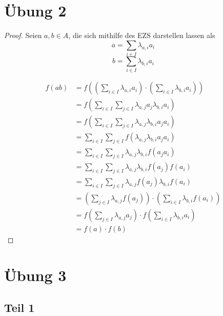 \documentclass[10pt,a4paper]{article}
\begin{document}
\section*{Übung 2}

\begin{proof}
Seien $a, b \in A$, die sich mithilfe des EZS darstellen lassen als
\begin{equation}
a = \sum_{i \in I} \lambda_{a, i} a_{i}
\end{equation}
\begin{equation}
b = \sum_{i \in I} \lambda_{b, i} a_{i}
\end{equation}

\begin{align*}
f(ab) & = f \left( \left( \sum_{i \in I} \lambda_{a, i} a_{i} \right) \cdot \left( \sum_{i \in I} \lambda_{b, i} a_{i} \right) \right)\\
& = f \left( \sum_{i \in I} \sum_{j \in I} \lambda_{a, j} a_{j} \lambda_{b, i} a_{i} \right)\\
& = f \left( \sum_{i \in I} \sum_{j \in I} \lambda_{a, j} \lambda_{b, i} a_{j} a_{i} \right)\\
& = \sum_{i \in I} \sum_{j \in I} f \left( \lambda_{a, j} \lambda_{b, i} a_{j} a_{i} \right)\\
& = \sum_{i \in I} \sum_{j \in I} \lambda_{a, j} \lambda_{b, i} f \left( a_{j} a_{i} \right)\\
& = \sum_{i \in I} \sum_{j \in I} \lambda_{a, j} \lambda_{b, i} f(a_{j}) f(a_{i})\\
& = \sum_{i \in I} \sum_{j \in I} \lambda_{a, j} f(a_{j}) \lambda_{b, i} f(a_{i})\\
& = \left( \sum_{j \in I} \lambda_{a, j} f(a_{j}) \right) \cdot \left( \sum_{i \in I} \lambda_{b, i} f(a_{i}) \right)\\
& = f \left( \sum_{j \in I} \lambda_{a, j} a_{j} \right) \cdot f \left( \sum_{i \in I} \lambda_{b, i} a_{i} \right)\\
& = f(a) \cdot f(b)
\end{align*}
\end{proof}

\section*{Übung 3}

\subsection*{Teil 1}
\end{document}
